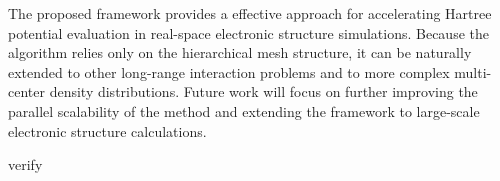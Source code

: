 \documentclass[a4paper,10pt]{article}
\newcommand{\printbibliography}{%
}
\begin{document}
The proposed framework provides a effective approach for accelerating Hartree potential evaluation in real-space electronic structure simulations. Because the algorithm relies only on the hierarchical mesh structure, it can be naturally extended to other long-range interaction problems and to more complex multi-center density distributions. Future work will focus on further improving the parallel scalability of the method and extending the framework to large-scale electronic structure calculations.

{\color{red}verify}

\printbibliography
\end{document}
